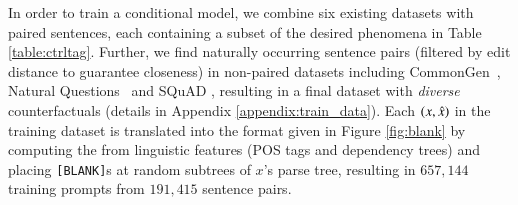 




In order to train a conditional model,
we combine six existing datasets with paired sentences, each containing a subset of the desired phenomena in Table \ref{table:ctrltag}. Further, we find naturally occurring sentence pairs (filtered by edit distance to guarantee closeness) in non-paired datasets including CommonGen~\cite{lin-etal-2020-commongen}, Natural Questions~\cite{kwiatkowski-etal-2019-natural} and SQuAD \cite{rajpurkar-etal-2016-squad}, resulting in a final dataset with \emph{diverse} counterfactuals (details in Appendix \ref{appendix:train_data}). 
Each $(x, \hat{x})$ in the training dataset is translated into the format given in Figure \ref{fig:blank} by computing the \tagstr from linguistic features (POS tags and dependency trees) and placing \texttt{[BLANK]}s at random subtrees of $x$'s parse tree, resulting in $657,144$ training prompts from $191,415$ sentence pairs.


